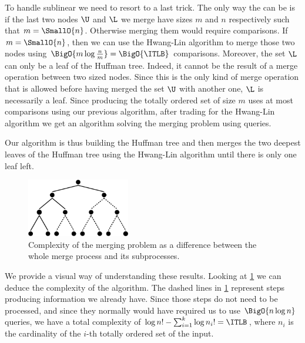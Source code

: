 To handle sublinear \ITLB we need to resort to a last trick. The only
way the \ITLB can be  is if the last two nodes \(\U\) and
\(\L\) we merge have sizes \(m\) and \(n\) respectively such that \(m =
\SmallO{n}\). Otherwise merging them would require  comparisons.
If \(m = \SmallO{n}\), then we can use the Hwang-Lin algorithm to merge those
two nodes using \(\BigO{m \log \frac{n}{m}} = \BigO{\ITLB}\) comparisons. Moreover, the set
\(\L\) can only be a leaf of the Huffman tree. Indeed, it cannot be the result
of a merge operation between two  sized nodes. Since this is the only
kind of merge operation that is allowed before having merged the set \(\U\)
with another one, \(\L\) is necessarily a leaf. Since producing the totally ordered
set of size \(m\) uses at most \BigO{\ITLB} comparisons using our
previous algorithm, after trading
\tapemerge for the Hwang-Lin algorithm we get an algorithm
solving the merging problem using \BigO{\ITLB} queries.

Our algorithm is thus building the Huffman tree and then merges the two deepest
leaves of the Huffman tree using the Hwang-Lin algorithm until there is only
one leaf left.

\begin{figure}
	\centering
	\includegraphics[width=0.4\textwidth]{fig/merging/huffman-2-trim}
	\caption{Complexity of the merging problem as a difference between the whole merge process and its subprocesses.}
	\label{tree:merging:fig/huffman-2}
\end{figure}

We provide a visual way of understanding these results. Looking at
\ref{tree:merging:fig/huffman-2} we can deduce the complexity of the algorithm.
The dashed lines in \ref{tree:merging:fig/huffman-2} represent steps producing
information we already have. Since those steps do not need to be processed, and
since they normally would have required us to use \(\BigO{n \log n}\) queries, we have a
total complexity of $\log n! - \sum_{i=1}^{k} \log n_i! = \ITLB$, where $n_i$ is the cardinality of the $i$-th totally ordered set
of the input.
